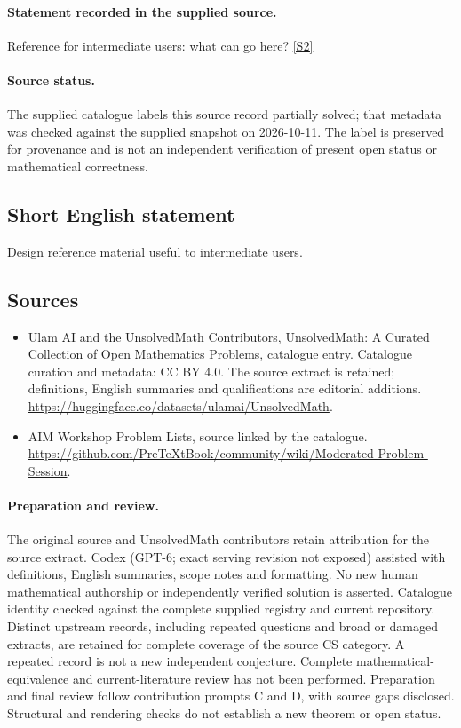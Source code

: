 \documentclass[11pt]{article}
\begin{document}
\paragraph{Statement recorded in the supplied source.}
Reference for intermediate users: what can go here? \href{https://github.com/PreTeXtBook/community/wiki/Moderated-Problem-Session}{[S2]}
\paragraph{Source status.}
The supplied catalogue labels this source record partially solved; that metadata was checked against the supplied snapshot on 2026-10-11. The label is preserved for provenance and is not an independent verification of present open status or mathematical correctness.
\subsection{Short English statement}
Design reference material useful to intermediate users.
\subsection{Sources}
\begin{itemize}
\item[S1] Ulam AI and the UnsolvedMath Contributors, UnsolvedMath: A Curated Collection of Open Mathematics Problems, catalogue entry. Catalogue curation and metadata: CC BY 4.0. The source extract is retained; definitions, English summaries and qualifications are editorial additions.
\url{https://huggingface.co/datasets/ulamai/UnsolvedMath}.
\item[S2] AIM Workshop Problem Lists, source linked by the catalogue.
\url{https://github.com/PreTeXtBook/community/wiki/Moderated-Problem-Session}.
\end{itemize}
\paragraph{Preparation and review.}
The original source and UnsolvedMath contributors retain attribution for the source extract. Codex (GPT-6; exact serving revision not exposed) assisted with definitions, English summaries, scope notes and formatting. No new human mathematical authorship or independently verified solution is asserted. Catalogue identity checked against the complete supplied registry and current repository. Distinct upstream records, including repeated questions and broad or damaged extracts, are retained for complete coverage of the source CS category. A repeated record is not a new independent conjecture. Complete mathematical-equivalence and current-literature review has not been performed. Preparation and final review follow contribution prompts C and D, with source gaps disclosed. Structural and rendering checks do not establish a new theorem or open status.
\label{end:statement}
\end{document}
